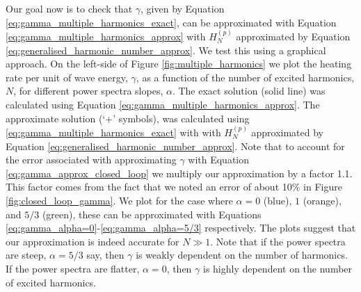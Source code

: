 Our goal now is to check that $\gamma$, given by Equation \eqref{eq:gamma_multiple_harmonics_exact}, can be approximated with Equation \eqref{eq:gamma_multiple_harmonics_approx} with $H_N^{(p)}$ approximated by Equation \eqref{eq:generalised_harmonic_number_approx}. We test this using a graphical approach. On the left-side of Figure \ref{fig:multiple_harmonics} we plot the heating rate per unit of wave energy, $\gamma$, as a function of the number of excited harmonics, $N$, for different power spectra slopes, $\alpha$. The exact solution (solid line) was calculated using Equation \eqref{eq:gamma_multiple_harmonics_approx}. The approximate solution (`+' symbols), was calculated using \eqref{eq:gamma_multiple_harmonics_exact} with with $H_N^{(p)}$ approximated by Equation \eqref{eq:generalised_harmonic_number_approx}. Note that to account for the error associated with approximating $\gamma$ with Equation \eqref{eq:gamma_approx_closed_loop} we multiply our approximation by a factor 1.1. This factor comes from the fact that we noted an error of about 10\% in Figure \ref{fig:closed_loop_gamma}.
We plot for the case where $\alpha=0$ (blue), $1$ (orange), and $5/3$ (green), these can be approximated with Equations \eqref{eq:gamma_alpha=0}-\eqref{eq:gamma_alpha=5/3} respectively. The plots suggest that our approximation is indeed accurate for $N\gg1$. Note that if the power spectra are steep, $\alpha=5/3$ say, then $\gamma$ is weakly dependent on the number of harmonics. If the power spectra are flatter, $\alpha=0$, then $\gamma$ is highly dependent on the number of excited harmonics.

